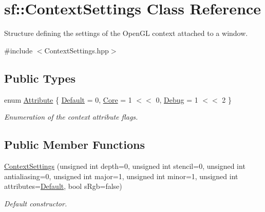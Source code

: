 \hypertarget{structsf_1_1_context_settings}{}\section{sf\+:\+:Context\+Settings Class Reference}
\label{structsf_1_1_context_settings}


Structure defining the settings of the Open\+GL context attached to a window.  




{\ttfamily \#include $<$Context\+Settings.\+hpp$>$}

\subsection*{Public Types}
\begin{DoxyCompactItemize}
\item 
enum \mbox{\hyperlink{structsf_1_1_context_settings_af2e91e57e8d26c40afe2ec8efaa32a2c}{Attribute}} \{ \mbox{\hyperlink{structsf_1_1_context_settings_af2e91e57e8d26c40afe2ec8efaa32a2cabf868dcb751b909bf031484ed42a93bb}{Default}} = 0, 
\mbox{\hyperlink{structsf_1_1_context_settings_af2e91e57e8d26c40afe2ec8efaa32a2cacb581130734cbd87cbbc9438429f4a8b}{Core}} = 1 $<$$<$ 0, 
\mbox{\hyperlink{structsf_1_1_context_settings_af2e91e57e8d26c40afe2ec8efaa32a2ca6043f67afb3d48918d5336474eabaafc}{Debug}} = 1 $<$$<$ 2
 \}
\begin{DoxyCompactList}\small\item\em Enumeration of the context attribute flags. \end{DoxyCompactList}\end{DoxyCompactItemize}
\subsection*{Public Member Functions}
\begin{DoxyCompactItemize}
\item 
\mbox{\hyperlink{structsf_1_1_context_settings_ac56869ccbb6bf0df48b88880754e12b7}{Context\+Settings}} (unsigned int depth=0, unsigned int stencil=0, unsigned int antialiasing=0, unsigned int major=1, unsigned int minor=1, unsigned int attributes=\mbox{\hyperlink{structsf_1_1_context_settings_af2e91e57e8d26c40afe2ec8efaa32a2cabf868dcb751b909bf031484ed42a93bb}{Default}}, bool s\+Rgb=false)
\begin{DoxyCompactList}\small\item\em Default constructor. \end{DoxyCompactList}\end{DoxyCompactItemize}
